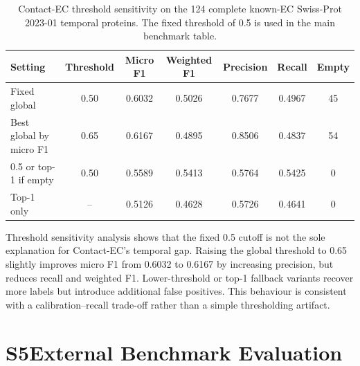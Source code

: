 \documentclass[11pt,a4paper]{article}
\begin{document}
\begin{table}[htbp]
\centering
\caption{Contact-EC threshold sensitivity on the 124 complete known-EC
Swiss-Prot 2023-01 temporal proteins. The fixed threshold of 0.5 is used in the
main benchmark table.}
\label{tab:threshold_sensitivity}
\setlength{\tabcolsep}{4pt}
\begin{tabular}{lcccccc}
\toprule
Setting & Threshold & Micro F1 & Weighted F1 & Precision & Recall & Empty \\
\midrule
Fixed global & 0.50 & 0.6032 & 0.5026 & 0.7677 & 0.4967 & 45 \\
Best global by micro F1 & 0.65 & 0.6167 & 0.4895 & 0.8506 & 0.4837 & 54 \\
0.5 or top-1 if empty & 0.50 & 0.5589 & 0.5413 & 0.5764 & 0.5425 & 0 \\
Top-1 only & -- & 0.5126 & 0.4628 & 0.5726 & 0.4641 & 0 \\
\bottomrule
\end{tabular}
\end{table}

Threshold sensitivity analysis shows that the fixed 0.5 cutoff is not the sole
explanation for Contact-EC's temporal gap. Raising the global threshold to 0.65
slightly improves micro F1 from 0.6032 to 0.6167 by increasing precision, but
reduces recall and weighted F1. Lower-threshold or top-1 fallback variants recover
more labels but introduce additional false positives. This behaviour is consistent
with a calibration--recall trade-off rather than a simple thresholding artifact.

\section*{S5\quad External Benchmark Evaluation}
\end{document}
